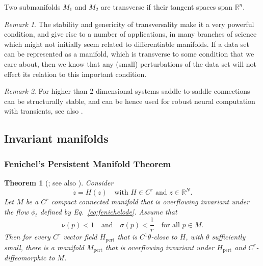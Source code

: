 \documentclass{article}
\newtheorem{theorem}{Theorem}
\theoremstyle{definition}
\theoremstyle{remark}
\newtheorem{remark}{Remark}
\newcounter{ct}
\begin{document}
Two submanifolds $M_1$ and $M_2$ are transverse if their tangent spaces span $\mathbb{R}^n$.

\begin{remark}
The stability and genericity of transversality make it a very powerful condition, and give rise to a number of applications, in many branches of science which might not initially seem related to
differentiable manifolds. If a data set can be represented as a manifold, which is transverse to some condition that we care about, then we know that any (small) perturbations of the data set will not effect its relation to this important condition.
\end{remark}


\begin{remark}
For higher than 2 dimensional systems saddle-to-saddle connections can be structurally stable, and can be hence used for robust neural computation with transients, see also \cite{rabinovich2008}.
\end{remark}





\subsection{Invariant manifolds}
\citep{roberts1989invariant,
kalitin2021attractors}

\citep{hirsch1970invariant}
\citep{wiggins1994nhim}
\citep{jones1995gspt}
\citep{kuehn2015multipletimescale}



\subsubsection{Fenichel's Persistent Manifold Theorem}
\begin{theorem}[\citep{fenichel1971persistence}; see also \citep{kuehn2015multipletimescale}]
 Consider
\begin{equation}\label{eq:fenichelode}
\dot{z} = H(z) \quad \text{with } H \in C^r \text{ and } z \in \mathbb{R}^N. 
\end{equation}
Let \( M \) be a \( C^r \) compact connected manifold that is overflowing invariant under the flow \( \phi_t \) defined by Eq.~\ref{eq:fenichelode}. Assume that
\begin{equation}
\nu(p) < 1 \quad \text{and} \quad \sigma(p) < \frac{1}{r} \quad \text{for all } p \in M. 
\end{equation}
Then for every \( C^r \) vector field \( H_{\text{pert}} \) that is \( C^1 \theta \)-close to \( H \), with \( \theta \) sufficiently small, there is a manifold \( M_{\text{pert}} \) that is overflowing invariant under \( H_{\text{pert}} \) and \( C^r \)-diffeomorphic to \( M \).
\end{theorem}
\end{document}
